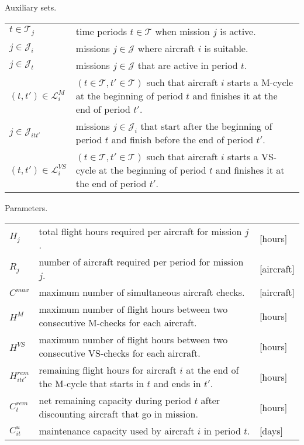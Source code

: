 Auxiliary sets.

  \begin{tabular}{p{20mm}p{120mm}}
    $t \in \mathcal{T}_j$        &  time periods $t \in \mathcal{T}$ when mission $j$ is active. \\
    $j \in \mathcal{J}_i$        &  missions $j \in \mathcal{J}$ where aircraft $i$ is suitable. \\
    $j \in \mathcal{J}_t$        &  missions $j \in \mathcal{J}$ that are active in period $t$. \\
    $(t, t') \in \mathcal{L}^{M}_{i}$         & $(t \in \mathcal{T}, t' \in \mathcal{T})$ such that aircraft $i$ starts a M-cycle at the beginning of period $t$ and finishes it at the end of period $t'$. \\
    $j \in \mathcal{J}_{itt'}$         & missions $j \in \mathcal{J}_i$ that start after the beginning of period $t$ and finish before the end of period $t'$.\\
    $(t, t') \in \mathcal{L}^{VS}_{i}$         & $(t \in \mathcal{T}, t' \in \mathcal{T})$ such that aircraft $i$ starts a VS-cycle at the beginning of period $t$ and finishes it at the end of period $t'$.\\
  \end{tabular}

  Parameters.

  \begin{tabular}{p{20mm}p{100mm}p{20mm}}
    $H_j$             & total flight hours required per aircraft for mission $j$. & [hours] \\
    $R_j$             & number of aircraft required per period for mission $j$. & [aircraft] \\
    $C^{max}$         & maximum number of simultaneous aircraft checks. & [aircraft] \\
    $H^{M}$         & maximum number of flight hours between two consecutive M-checks for each aircraft. & [hours] \\
    $H^{VS}$         & maximum number of flight hours between two consecutive VS-checks for each aircraft. & [hours] \\
    $H^{rem}_{itt'}$ & remaining flight hours for aircraft $i$ at the end of the M-cycle that starts in $t$ and ends in $t'$.& [hours] \\
    $C^{rem}_{t}$ & net remaining capacity during period $t$ after discounting aircraft that go in mission.& [hours] \\
    $C^{u}_{it}$ & maintenance capacity used by aircraft $i$ in period $t$. & [days] \\
  \end{tabular}


